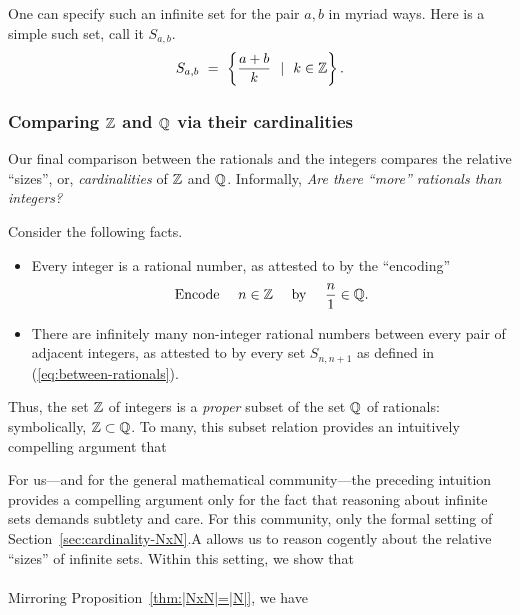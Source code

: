One can specify such an infinite set for the pair $a,b$ in myriad
ways.  Here is a simple such set, call it $S_{a,b}$.
\begin{equation}
\label{eq:between-rationals}
S_{a,b} \ = \ \left\{ \frac{a+b}{k} \ \ | \ \ k \in \mathbb{Z} \right\}.
\end{equation}

\subsubsection{Comparing $\mathbb{Z}$ and $\Q$ via their cardinalities}
\label{sec:Q-Z-cardinality}

Our final comparison between the rationals and the integers compares
the relative ``sizes'', or, {\em cardinalities} of $\mathbb{Z}$ and $\Q$.
Informally, {\it Are there ``more'' rationals than integers?}

\medskip

\noindent Consider the following facts.
\begin{itemize}
\item
Every integer is a rational number, as attested to by the ``encoding''
\begin{equation}
\label{eq:ZintoQ}
\mbox{Encode } \ \ \ n \in \mathbb{Z} \ \ \ \mbox{ by } \ \ \ {n \over 1} \in \mathbb{Q} .
\end{equation}

\item
There are infinitely many non-integer rational numbers between every
pair of adjacent integers, as attested to by every set $S_{n,n+1}$ as
defined in (\ref{eq:between-rationals}).
\end{itemize}
Thus, the set $\mathbb{Z}$ of integers is a {\em proper} subset of the set
$\Q$ of rationals: symbolically, $\mathbb{Z} \subset \mathbb{Q}$.  To many, this
subset relation provides an intuitively compelling argument that \\
\hspace*{.35in}{\em there are more rational numbers than integers.}

For us---and for the general mathematical community---the preceding
intuition provides a compelling argument only for the fact that
reasoning about infinite sets demands subtlety and care.  For this
community, only the formal setting of
Section~\ref{sec:cardinality-NxN}.A allows us to reason cogently about
the relative ``sizes'' of infinite sets.  Within this setting, we show
that \\
\hspace*{.35in}{\em the set $\N$ has the same cardinality as the set $\Q$.}  \\
Mirroring Proposition~\ref{thm:|NxN|=|N|}, we have

